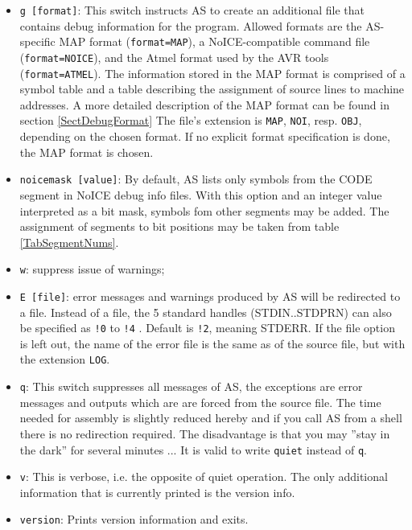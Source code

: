 \documentclass[12pt,twoside]{report}
\newcommand{\tty}[1]{{\tt #1}}
\newcommand{\asname}{{AS}}
\begin{document}
\begin{itemize}
\item{\tty{g [format]}: This switch instructs \asname{} to create an additional
      file that contains debug information for the program.  Allowed
      formats are the \asname{}-specific MAP format ({\tt format=MAP}), a
      NoICE-compatible command file ({\tt format=NOICE}), and the Atmel
      format used by the AVR tools ({\tt format=ATMEL}). The information
      stored in the MAP format is comprised of a symbol table and a table
      describing the assignment of source lines to machine addresses.  A
      more detailed description of the MAP format can be found in section
      \ref{SectDebugFormat}  The file's extension is \tty{MAP}, \tty{NOI},
      resp. \tty{OBJ}, depending on the chosen format.  If no explicit
      format specification is done, the MAP format is chosen.}
\item{\tty{noicemask [value]}: By default, \asname{} lists only symbols from the
      CODE segment in NoICE debug info files.  With this option and an
      integer value interpreted as a bit mask, symbols fom other segments
      may be added.  The assignment of segments to bit positions may
      be taken from table \ref{TabSegmentNums}.}
\item{\tty{w}: suppress issue of warnings;}
\item{\tty{E [file]}: error messages and warnings produced by \asname{} will be
      redirected to a file. Instead of a file, the 5 standard
      handles (STDIN..STDPRN) can also be specified as
      \tty{!0} to \tty{!4} . Default is \tty{!2}, meaning STDERR.  If the
      file option is left out, the name of the error file
      is the same as of the source file, but with the
      extension \tty{LOG}.}
\item{\tty{q}: This switch suppresses all messages of \asname{}, the exceptions are
      error messages and outputs which are are forced from the
      source file.  The time needed for assembly is slightly reduced
      hereby and if you call \asname{} from a shell there is no redirection
      required.  The disadvantage is that you may ''stay in the dark''
      for several minutes ... It is valid to write \tty{quiet} instead
      of \tty{q}.}
\item{\tty{v}: This is verbose, i.e. the opposite of quiet operation.  The
      only additional information that is currently printed is the version
      info.}
\item{\tty{version}: Prints version information and exits.}

\end{itemize}
\end{document}
